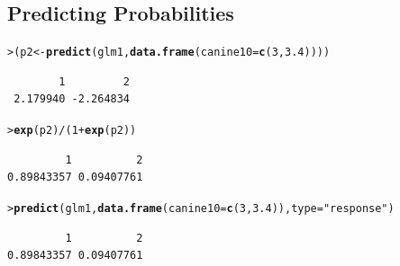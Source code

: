 \documentclass{article}\usepackage[]{graphicx}\usepackage[]{color}
\makeatletter
\newcommand{\hlnum}[1]{\textcolor[rgb]{0.686,0.059,0.569}{#1}}%
\newcommand{\hlstr}[1]{\textcolor[rgb]{0.192,0.494,0.8}{#1}}%
\newcommand{\hlopt}[1]{\textcolor[rgb]{0,0,0}{#1}}%
\newcommand{\hlstd}[1]{\textcolor[rgb]{0.345,0.345,0.345}{#1}}%
\newcommand{\hlkwb}[1]{\textcolor[rgb]{0.69,0.353,0.396}{#1}}%
\newcommand{\hlkwc}[1]{\textcolor[rgb]{0.333,0.667,0.333}{#1}}%
\newcommand{\hlkwd}[1]{\textcolor[rgb]{0.737,0.353,0.396}{\textbf{#1}}}%
\newenvironment{kframe}{%
 \def\at@end@of@kframe{}%
 \ifinner\ifhmode%
  \def\at@end@of@kframe{\end{minipage}}%
  \begin{minipage}{\columnwidth}%
 \fi\fi%
 \def\FrameCommand##1{\hskip\@totalleftmargin \hskip-\fboxsep
 \colorbox{shadecolor}{##1}\hskip-\fboxsep
     \hskip-\linewidth \hskip-\@totalleftmargin \hskip\columnwidth}%
 \MakeFramed {\advance\hsize-\width
   \@totalleftmargin\z@ \linewidth\hsize
   \@setminipage}}%
 {\par\unskip\endMakeFramed%
 \at@end@of@kframe}
\newenvironment{knitrout}{}{} %
\makeatother
\begin{document}
\subsection{Predicting Probabilities}
\begin{knitrout}
\color{fgcolor}\begin{kframe}
\begin{alltt}
\hlstd{> }\hlstd{( p2} \hlkwb{<-} \hlkwd{predict}\hlstd{(glm1,}\hlkwd{data.frame}\hlstd{(}\hlkwc{canine10}\hlstd{=}\hlkwd{c}\hlstd{(}\hlnum{3}\hlstd{,}\hlnum{3.4}\hlstd{))) )}
\end{alltt}
\begin{verbatim}
        1         2 
 2.179940 -2.264834 
\end{verbatim}
\begin{alltt}
\hlstd{> }\hlkwd{exp}\hlstd{(p2)}\hlopt{/}\hlstd{(}\hlnum{1}\hlopt{+}\hlkwd{exp}\hlstd{(p2))}
\end{alltt}
\begin{verbatim}
         1          2 
0.89843357 0.09407761 
\end{verbatim}
\begin{alltt}
\hlstd{> }\hlkwd{predict}\hlstd{(glm1,}\hlkwd{data.frame}\hlstd{(}\hlkwc{canine10}\hlstd{=}\hlkwd{c}\hlstd{(}\hlnum{3}\hlstd{,}\hlnum{3.4}\hlstd{)),}\hlkwc{type}\hlstd{=}\hlstr{"response"}\hlstd{)}
\end{alltt}
\begin{verbatim}
         1          2 
0.89843357 0.09407761 
\end{verbatim}
\end{kframe}
\end{knitrout}
\end{document}
